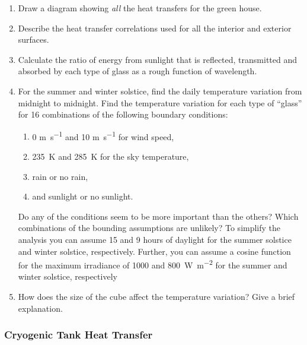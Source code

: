 \documentclass[12pt,letterpaper]{article}
\begin{document}
\begin{enumerate}
    \item Draw a diagram showing \textit{all} the heat transfers for the green house.

    \item Describe the heat transfer correlations used for all the interior and exterior surfaces.

    \item Calculate the ratio of energy from sunlight that is reflected, transmitted and absorbed by each type of glass as a rough function of wavelength.
    
    \item For the summer and winter solstice, find the daily temperature variation from midnight to midnight.
        Find the temperature variation for each type of ``glass'' for 16 combinations of the following boundary conditions:
        \begin{enumerate}
            \item 0 \si{\meter\per\second} and 10 \si{\meter\per\second} for wind speed,
            \item \SI{235}{\kelvin} and \SI{285}{\kelvin} for the sky temperature,
            \item rain or no rain,
            \item and sunlight or no sunlight.
        \end{enumerate}
        Do any of the conditions seem to be more important than the others?
        Which combinations of the bounding assumptions are unlikely?
        To simplify the analysis you can assume 15 and 9 hours of daylight for the summer solstice and winter solstice, respectively.
        Further, you can assume a cosine function for the maximum irradiance of 1000 and \SI{800}{\watt\per\square\meter} for the summer and winter solstice, respectively
    
        \item How does the size of the cube affect the temperature variation?
            Give a brief explanation.
\end{enumerate}


\subsubsection*{Cryogenic Tank Heat Transfer}
\end{document}
